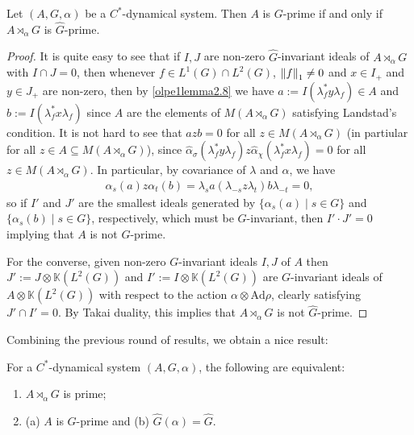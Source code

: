\begin{lemma}
	Let $(A, G, \alpha)$ be a $C^*$-dynamical system. Then $A$ is $G$-prime if and only if $A \rtimes_\alpha G$ is $\hat G$-prime.			
	\label{olpe1.5.7}
\end{lemma}
\begin{proof}
	It is quite easy to see that if $I,J$ are non-zero $\hat G$-invariant ideals of $A \rtimes_\alpha G$ with $I \cap J = 0$, then whenever $f \in L^1(G) \cap L^2(G)$, $\left\lVert f \right\rVert_1  \neq 0$ and $x \in I_+$ and $y \in J_+$ are non-zero, then by \cref{olpe1lemma2.8} we have $a := I(\lambda_f^* y \lambda_f) \in A$ and $b := I(\lambda_f^* x \lambda_f)$ since $A$ are the elements of $M(A \rtimes_\alpha G)$ satisfying Landstad's condition. It is not hard to see that $a z b = 0$ for all $z \in M(A \rtimes_\alpha G)$ (in partiular for all $z \in A \subseteq M(A \rtimes_\alpha G)$), since $\hat \alpha_{\sigma}(\lambda_f^* y \lambda_f) z \hat \alpha_{\chi}(\lambda_f^* x \lambda_f) = 0$ for all $z \in M(A \rtimes_\alpha G)$. In particular, by covariance of $\lambda$ and $\alpha$, we have
	\begin{align*}
		\alpha_s(a) z \alpha_t(b) = \lambda_s a (\lambda_{-s} z \lambda_t) b \lambda_{-t}=0,
	\end{align*}
	so if $I'$ and $J'$ are the smallest ideals generated by $\{ \alpha_s(a) \mid s \in G\}$ and $\{ \alpha_s(b) \mid s \in G\}$, respectively, which must be $G$-invariant, then $I'\cdot J' = 0$ implying that $A$ is not $G$-prime.

	For the converse, given non-zero $G$-invariant ideals $I,J$ of $A$ then $J':=J \otimes \mathbb{K}(L^2(G))$ and $I':=I \otimes \mathbb{K}(L^2(G))$ are $G$-invariant ideals of $A \otimes \mathbb{K}(L^2(G))$ with respect to the action $\alpha \otimes \mathrm{Ad} \rho$, clearly satisfying $ J'\cap I' = 0$. By Takai duality, this implies that $A \rtimes_\alpha G$ is not $\hat G$-prime. 
\end{proof}
Combining the previous round of results, we obtain a nice result:
\begin{corollary}
	For a $C^*$-dynamical system $(A,G,\alpha)$, the following are equivalent:
	\begin{enumerate}
		\item $A \rtimes_\alpha G$ is prime;
		\item (a) $A$ is $G$-prime and (b) $\hat G(\alpha) = \hat G$.
	\end{enumerate}
	\label{olpe1.5.8}
\end{corollary}

